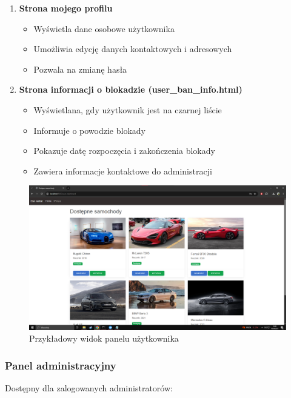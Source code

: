 \documentclass[12pt,a4paper]{article}
\begin{document}
\begin{enumerate}
    \item \textbf{Strona mojego profilu}
    \begin{itemize}
        \item Wyświetla dane osobowe użytkownika
        \item Umożliwia edycję danych kontaktowych i adresowych
        \item Pozwala na zmianę hasła
    \end{itemize}
    
    \item \textbf{Strona informacji o blokadzie (user\_ban\_info.html)}
    \begin{itemize}
        \item Wyświetlana, gdy użytkownik jest na czarnej liście
        \item Informuje o powodzie blokady
        \item Pokazuje datę rozpoczęcia i zakończenia blokady
        \item Zawiera informacje kontaktowe do administracji
    \end{itemize}
\end{enumerate}

\begin{figure}[H]
    \centering
    \includegraphics[width=1\textwidth]{user_panel.png}
    \caption{Przykładowy widok panelu użytkownika}
    \label{fig:user-panel}
\end{figure}

\subsubsection{Panel administracyjny}
Dostępny dla zalogowanych administratorów:
\end{document}
